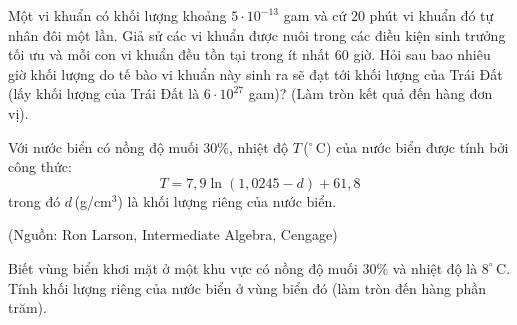 \begin{bt}%

	Một vi khuẩn có khối lượng khoảng $5 \cdot 10^{-13}$ gam và cứ $20$ phút vi khuẩn đó tự nhân đôi một lần. Giả sử các vi khuẩn được nuôi trong các điều kiện sinh trưởng tối ưu và mỗi con vi khuẩn đều tồn tại trong ít nhất $60$ giờ. Hỏi sau bao nhiêu giờ khối lượng do tế bào vi khuẩn này sinh ra sẽ đạt tới khối lượng của Trái Đất (lấy khối lượng của Trái Đất là $6 \cdot 10^{27}$ gam)? (Làm tròn kết quả đến hàng đơn vị).
\end{bt}

\begin{bt}%

	Với nước biển có nồng độ muối $30\%$, nhiệt độ $T$\,($^{\circ}$\,C) của nước biển được tính bởi công thức:  
	\[T = 7{,}9 \ln(1{,}0245 - d) + 61{,}8\]
	trong đó $d$\,(g/cm$^3$) là khối lượng riêng của nước biển.  
	\begin{flushright}
		(Nguồn: Ron Larson, Intermediate Algebra, Cengage)  
	\end{flushright}
	Biết vùng biển khơi mặt ở một khu vực có nồng độ muối $30\%$ và nhiệt độ là $8^{\circ}\,\mathrm{C}$. Tính khối lượng riêng của nước biển ở vùng biển đó (làm tròn đến hàng phần trăm).
\end{bt}

